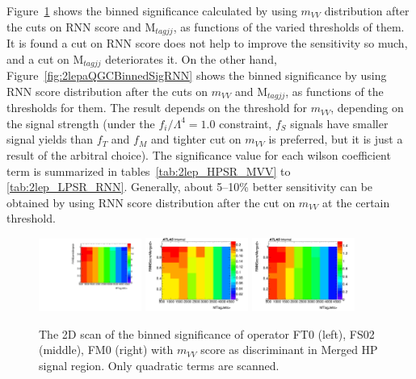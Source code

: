 Figure~\ref{fig:2lepaQGCBinnedSigMVV} shows the binned significance calculated by using $m_{VV}$ distribution after the cuts on RNN score and $\mathrm{M}_{tagjj}$, as functions of the varied thresholds of them.
It is found a cut on RNN score does not help to improve the sensitivity so much,
and a cut on $\mathrm{M}_{tagjj}$ deteriorates it.
On the other hand, Figure~\ref{fig:2lepaQGCBinnedSigRNN} shows the binned significance by using RNN score distribution
after the cuts on $m_{VV}$ and $\mathrm{M}_{tagjj}$, as functions of the thresholds for them.
The result depends on the threshold for $m_{VV}$, depending on the signal strength (under the $f_i/\Lambda^4 = 1.0$ constraint, $f_{S}$ signals have smaller signal yields than $f_{T}$ and $f_{M}$ and tighter cut on $m_{VV}$ is preferred, but it is just a result of the arbitral choice).
The significance value for each wilson coefficient term is summarized in tables~\ref{tab:2lep_HPSR_MVV} to \ref{tab:2lep_LPSR_RNN}.
Generally, about 5--10\% better sensitivity can be obtained by using RNN score distribution after the cut on $m_{VV}$ at the certain threshold.

\begin{figure}[ht]
    \centering
    	\includegraphics[width=0.30\textwidth]{figures/aQGC/HPSRFT0MVV.pdf}
    	\includegraphics[width=0.30\textwidth]{figures/aQGC/HPSRFS02MVV.pdf}
        \includegraphics[width=0.30\textwidth]{figures/aQGC/HPSRFM0MVV.pdf}
        \caption{The 2D scan of the binned significance of operator FT0 (left), FS02 (middle), FM0 (right) with $m_{VV}$ score as discriminant in Merged HP signal region. Only quadratic terms are scanned.}
        \label{fig:2lepaQGCBinnedSigMVV}
\end{figure}

